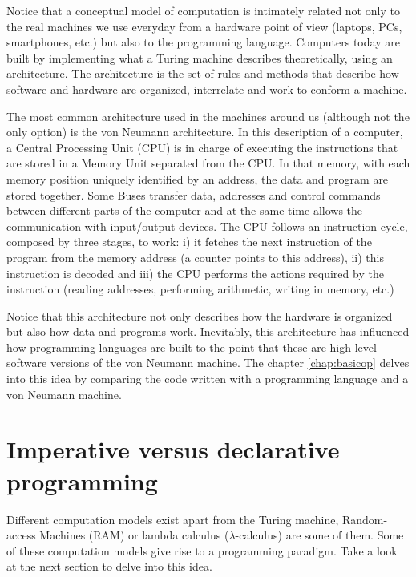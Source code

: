 Notice that a conceptual model of computation is intimately related not only to the 
real machines we use everyday from a hardware point of view (laptops, PCs, smartphones, etc.) 
but also to the programming language. 
Computers today are built by implementing what 
a Turing machine describes theoretically, using an architecture. 
The architecture is the set of rules and methods that describe how software 
and hardware are organized, interrelate and work to conform a machine.

The most common architecture used in the machines around us (although not the only option) is the von Neumann architecture. 
In this description of a computer, a Central Processing Unit (CPU) is in charge of executing the instructions that are stored in a Memory Unit separated from the CPU. 
In that memory, with each memory position uniquely identified by an address, the data and program are stored together. 
Some Buses transfer data, addresses and control commands between different parts of the computer
and at the same time allows the communication with input/output devices.
The CPU follows an instruction cycle, composed by three stages, to work: 
i) it fetches the next instruction of the program from the memory address (a counter points to this address), 
ii) this instruction is decoded and 
iii) the CPU performs the actions required by the instruction (reading addresses, performing arithmetic, writing in memory, etc.)


Notice that this architecture not only describes how the hardware is organized but also how data and programs work.
Inevitably, this architecture has influenced how programming languages are built to the point that 
these are high level software versions of the von Neumann machine. 
The chapter \ref{chap:basicop} delves into this idea by comparing the code written with a programming language and a von Neumann machine.



 
 
    \section{Imperative versus declarative programming} 

Different computation models exist apart from the Turing machine, 
Random-access Machines (RAM) or lambda calculus ($\lambda$-calculus) are some of them. 
Some of these computation models give rise to a programming paradigm. 
Take a look at the next section to delve into this idea.  

